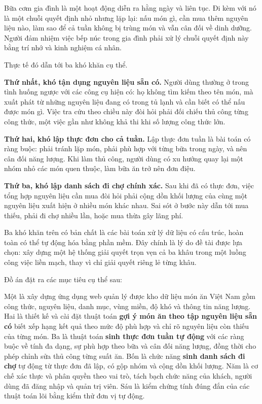 

Bữa cơm gia đình là một hoạt động diễn ra hằng ngày và liên tục. Đi kèm với nó
là một chuỗi quyết định nhỏ nhưng lặp lại: nấu món gì, cần mua thêm nguyên liệu
nào, làm sao để cả tuần không bị trùng món và vẫn cân đối về dinh dưỡng. Người
đảm nhiệm việc bếp núc trong gia đình phải xử lý chuỗi quyết định này bằng trí
nhớ và kinh nghiệm cá nhân.

Thực tế đó dẫn tới ba khó khăn cụ thể.

\textbf{Thứ nhất, khó tận dụng nguyên liệu sẵn có.} Người dùng thường ở trong
tình huống ngược với các công cụ hiện có: họ không tìm kiếm theo tên món, mà
xuất phát từ những nguyên liệu đang có trong tủ lạnh và cần biết có thể nấu được
món gì. Việc tra cứu theo chiều này đòi hỏi phải đối chiếu thủ công từng công
thức, một việc gần như không khả thi khi số lượng công thức lớn.

\textbf{Thứ hai, khó lập thực đơn cho cả tuần.} Lập thực đơn tuần là bài toán có
ràng buộc: phải tránh lặp món, phải phù hợp với từng bữa trong ngày, và nên cân
đối năng lượng. Khi làm thủ công, người dùng có xu hướng quay lại một nhóm nhỏ
các món quen thuộc, làm bữa ăn trở nên đơn điệu.

\textbf{Thứ ba, khó lập danh sách đi chợ chính xác.} Sau khi đã có thực đơn,
việc tổng hợp nguyên liệu cần mua đòi hỏi phải cộng dồn khối lượng của cùng một
nguyên liệu xuất hiện ở nhiều món khác nhau. Sai sót ở bước này dẫn tới mua
thiếu, phải đi chợ nhiều lần, hoặc mua thừa gây lãng phí.

Ba khó khăn trên có bản chất là các bài toán xử lý dữ liệu có cấu trúc, hoàn
toàn có thể tự động hóa bằng phần mềm. Đây chính là lý do đề tài được lựa chọn:
xây dựng một hệ thống giải quyết trọn vẹn cả ba khâu trong một luồng công việc
liền mạch, thay vì chỉ giải quyết riêng lẻ từng khâu.


Đồ án đặt ra các mục tiêu cụ thể sau:

Một là xây dựng ứng dụng web quản lý được kho dữ liệu món ăn Việt Nam gồm công
thức, nguyên liệu, danh mục, vùng miền, độ khó và thông tin năng lượng. Hai là
thiết kế và cài đặt thuật toán \textbf{gợi ý món ăn theo tập nguyên liệu sẵn có}
biết xếp hạng kết quả theo mức độ phù hợp và chỉ rõ nguyên liệu còn thiếu của
từng món. Ba là thuật toán \textbf{sinh thực đơn tuần tự động} với các ràng buộc
về tính đa dạng, sự phù hợp theo bữa và cân đối năng lượng, đồng thời cho phép
chỉnh sửa thủ công từng suất ăn. Bốn là chức năng \textbf{sinh danh sách đi chợ}
tự động từ thực đơn đã lập, có gộp nhóm và cộng dồn khối lượng. Năm là cơ chế
xác thực và phân quyền theo vai trò, tách bạch chức năng của khách, người dùng
đã đăng nhập và quản trị viên. Sáu là kiểm chứng tính đúng đắn của các thuật
toán lõi bằng kiểm thử đơn vị tự động.

